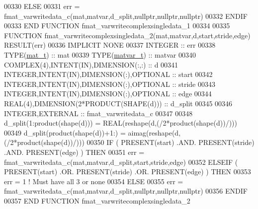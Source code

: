 \begin{DoxyCode}
00330     \textcolor{keywordflow}{ELSE}
00331         err = fmat\_varwritedata\_c(mat,matvar,d\_split,nullptr,nullptr,nullptr)
00332 \textcolor{keywordflow}{    ENDIF}
00333 \textcolor{keyword}{END FUNCTION }fmat\_varwritecomplexsingledata\_1
00334 
00335 \textcolor{keyword}{FUNCTION }fmat\_varwritecomplexsingledata\_2(mat,matvar,d,start,stride,edge) \textcolor{keyword}{RESULT}(err)
00336 \textcolor{keywordtype}{IMPLICIT NONE}
00337     \textcolor{keywordtype}{INTEGER}                                  :: err
00338     \textcolor{keywordtype}{TYPE}(\hyperlink{group___m_a_t_gab0fc888f5a5d79943b16284b1f91c2e8}{mat\_t})                              :: mat
00339     \textcolor{keywordtype}{TYPE}(\hyperlink{group___m_a_t_structmatvar__t}{matvar\_t})                           :: matvar
00340     \textcolor{keywordtype}{COMPLEX(4)},\textcolor{keywordtype}{INTENT(IN)},\textcolor{keywordtype}{DIMENSION(:,:)} :: d
00341     \textcolor{keywordtype}{INTEGER},\textcolor{keywordtype}{INTENT(IN)},\textcolor{keywordtype}{DIMENSION(:)},\textcolor{keywordtype}{OPTIONAL} :: start
00342     \textcolor{keywordtype}{INTEGER},\textcolor{keywordtype}{INTENT(IN)},\textcolor{keywordtype}{DIMENSION(:)},\textcolor{keywordtype}{OPTIONAL} :: stride
00343     \textcolor{keywordtype}{INTEGER},\textcolor{keywordtype}{INTENT(IN)},\textcolor{keywordtype}{DIMENSION(:)},\textcolor{keywordtype}{OPTIONAL} :: edge
00344     \textcolor{keywordtype}{REAL(4)},\textcolor{keywordtype}{DIMENSION(2*PRODUCT(SHAPE(d)))} :: d\_split
00345 
00346     \textcolor{keywordtype}{INTEGER},\textcolor{keywordtype}{EXTERNAL}                         :: fmat\_varwritedata\_c
00347 
00348     d\_split(1:product(shape(d)))  = \textcolor{keywordtype}{REAL}(reshape(d,(/2*product(shape(d))/)))
00349     d\_split(product(shape(d))+1:) = aimag(reshape(d,(/2*product(shape(d))/)))
00350     \textcolor{keywordflow}{IF} ( \textcolor{keyword}{PRESENT}(start) .AND. \textcolor{keyword}{PRESENT}(stride) .AND. \textcolor{keyword}{PRESENT}(edge) ) \textcolor{keywordflow}{THEN}
00351         err = fmat\_varwritedata\_c(mat,matvar,d\_split,start,stride,edge)
00352     \textcolor{keywordflow}{ELSEIF} ( \textcolor{keyword}{PRESENT}(start) .OR. \textcolor{keyword}{PRESENT}(stride) .OR. \textcolor{keyword}{PRESENT}(edge) ) \textcolor{keywordflow}{THEN}
00353         err = 1    \textcolor{comment}{! Must have all 3 or none}
00354     \textcolor{keywordflow}{ELSE}
00355         err = fmat\_varwritedata\_c(mat,matvar,d\_split,nullptr,nullptr,nullptr)
00356 \textcolor{keywordflow}{    ENDIF}
00357 \textcolor{keyword}{END FUNCTION }fmat\_varwritecomplexsingledata\_2

\end{DoxyCode}
